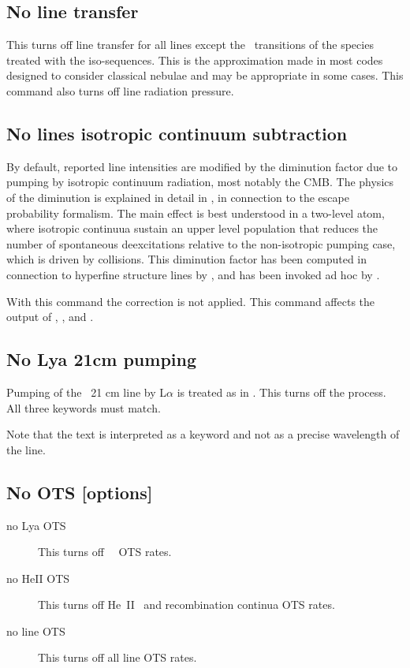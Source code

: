 \subsection{No line transfer}

This turns off line transfer for all lines except the
\la\ transitions
of the species treated with the iso-sequences.
This is the approximation
made in most codes designed to consider classical nebulae and may be
appropriate in some cases.
This command also turns off line radiation pressure.


\subsection{No lines isotropic continuum subtraction}
\label{sec:no-lines-isotropic-continuum-subtraction}

By default, reported line intensities are modified by the diminution factor
due to pumping by isotropic continuum radiation, most notably the CMB.
The physics of the diminution is explained in detail in \citet{Chatzikos2013},
in connection to the escape probability formalism.
The main effect is best understood in a two-level atom, where isotropic
continuua sustain an upper level population that reduces the number of
spontaneous deexcitations relative to the non-isotropic pumping case,
which is driven by collisions.
This diminution factor has been computed in connection to hyperfine structure
lines by \citet{DCruz1998}, and has been invoked ad hoc by \citet{Goldreich1974}.

\par
With this command the correction is not applied.
This command affects the output of
,
,
and .


\subsection{No Lya 21cm pumping}

Pumping of the \hi\ 21 cm line by L$\alpha $ is treated
as in \citet{Deguchi1985}.
This turns off the process.
All three keywords must match.

Note that the text \cdCommand{21cm} is interpreted as a keyword and not as a precise wavelength
of the line.

\subsection{No OTS [options]}
\begin{description}
\item[no Lya OTS]  This turns off \hi\ \la\ OTS rates.

\item[no HeII OTS]  This turns off He~II \la\ and recombination continua OTS rates.

\item[no line OTS]  This turns off all line OTS rates.
\end{description}

